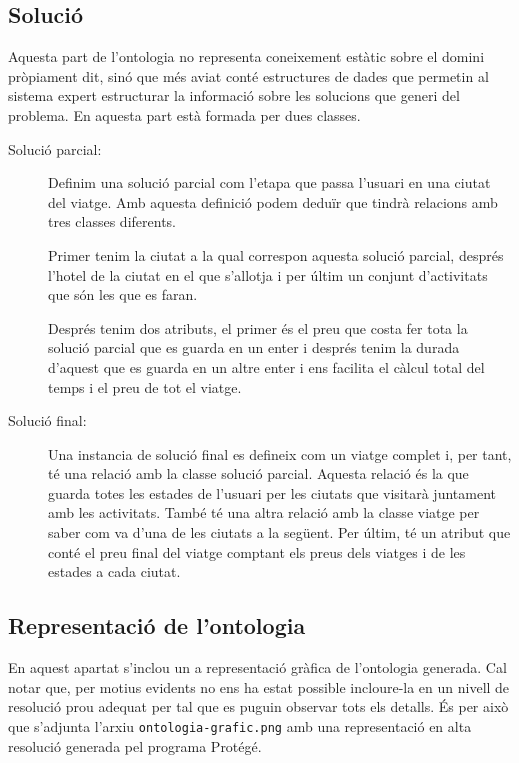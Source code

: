 \documentclass[11pt,a4paper]{article}
\begin{document}
\subsection{Solució} 
Aquesta part de l'ontologia no representa coneixement estàtic sobre el domini pròpiament dit, sinó que més aviat conté estructures de dades que permetin al sistema expert estructurar la informació sobre les solucions que generi del problema. En aquesta part està formada per dues classes.

\begin{description}
\item[Solució parcial:] Definim una solució parcial com l'etapa que passa l'usuari en una ciutat del viatge. Amb aquesta definició podem deduïr que tindrà relacions amb tres classes diferents.

Primer tenim la ciutat a la qual correspon aquesta solució parcial, després l'hotel de la ciutat en el que s'allotja i per últim un conjunt d'activitats que són les que es faran.

Després tenim dos atributs, el primer és el preu que costa fer tota la solució parcial que es guarda en un enter i després tenim la durada d'aquest que es guarda en un altre enter i ens facilita el càlcul total del temps i el preu de tot el viatge.

\item[Solució final:] Una instancia de solució final es defineix com un viatge complet i, per tant, té una relació amb la classe solució parcial. Aquesta relació és la que guarda totes les estades de l'usuari per les ciutats que visitarà juntament amb les activitats. També té una altra relació amb la classe viatge per saber com va d'una de les ciutats a la següent. Per últim, té un atribut que conté el preu final del viatge comptant els preus dels viatges i de les estades a cada ciutat.

\end{description}

\clearpage

\subsection{Representació de l'ontologia}
En aquest apartat s'inclou un a representació gràfica de l'ontologia generada. Cal notar que, per motius evidents no ens ha estat possible incloure-la en un nivell de resolució prou adequat per tal que es puguin observar tots els detalls. És per això que s'adjunta l'arxiu \texttt{ontologia-grafic.png} amb una representació en alta resolució generada pel programa Protégé.
\end{document}
